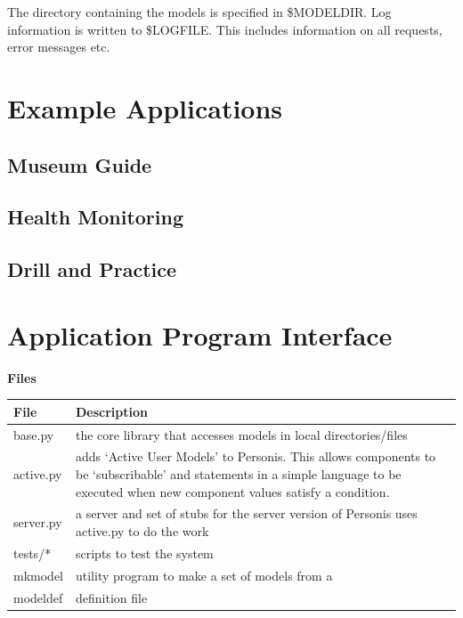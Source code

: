 \documentclass[letterpaper,10pt,english]{sphinxmanual}
\begin{document}
The directory containing the models is specified in \$MODELDIR.
Log information is written to \$LOGFILE. This includes information on all requests, error messages etc.


\chapter{Example Applications}
\label{Examples::doc}\label{Examples:example-applications}

\section{Museum Guide}
\label{Examples:museum-guide}

\section{Health Monitoring}
\label{Examples:health-monitoring}

\section{Drill and Practice}
\label{Examples:drill-and-practice}

\chapter{Application Program Interface}
\label{API:application-program-interface}\label{API::doc}
\textbf{Files}

\begin{tabulary}{\linewidth}{|L|L|}
\hline
\textbf{
File
} & \textbf{
Description
}\\\hline

base.py
 & 
the core library that accesses models in local directories/files
\\\hline

active.py
 & 
adds `Active User Models' to Personis. This allows components to
be `subscribable' and statements in a simple language to be
executed when new component values satisfy a condition.
\\\hline

server.py
 & 
a server and set of stubs for the server version of Personis
uses active.py to do the work
\\\hline

tests/*
 & 
scripts to test the system
\\\hline

mkmodel
 & 
utility program to make a set of models from a
\\\hline

modeldef
 & 
definition file
\\\hline
\end{tabulary}
\end{document}
